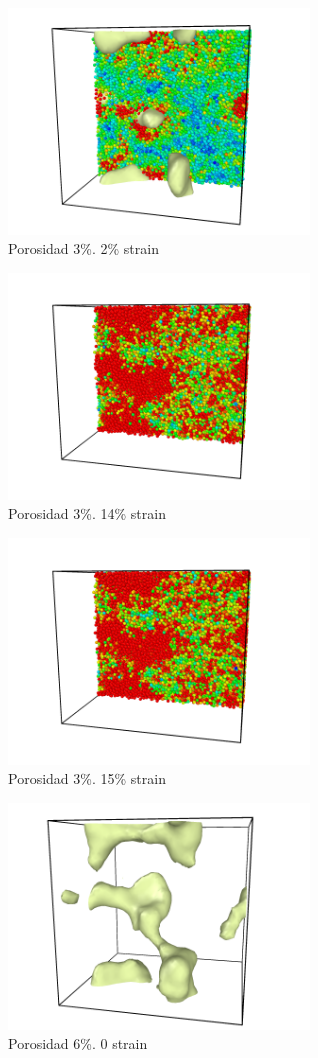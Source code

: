 \documentclass[10pt, oneside]{article} %
\begin{document}
\begin{figure}[H]
\centering
\includegraphics[width=8cm]{Figures/5_2strain_color.png}
\caption{Porosidad 3\%. 2\% strain}
\end{figure}

\begin{figure}[H]
\centering
\includegraphics[width=8cm]{Figures/5_14strain_color.png}
\caption{Porosidad 3\%. 14\% strain}
\end{figure}

\begin{figure}[H]
\centering
\includegraphics[width=8cm]{Figures/5_15strain_color.png}
\caption{Porosidad 3\%. 15\% strain}
\end{figure}

\begin{figure}[H]
\centering
\includegraphics[width=8cm]{Figures/9_0strain.png}
\caption{Porosidad 6\%. 0 strain}
\end{figure}
\end{document}
